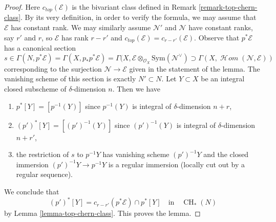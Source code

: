 \documentclass[10pt,a4paper]{amsart}
\theoremstyle{plain}
\theoremstyle{definition}
\theoremstyle{remark}
\numberwithin{equation}{subsection}
\def\SheafHom{\mathop{\mathcal{H}\!\mathit{om}}\nolimits}
\def\CH{\mathop{\mathrm{CH}}\nolimits}
\begin{document}
\begin{proof}
Here $c_{top}(\mathcal{E})$ is the bivariant class defined in
Remark \ref{remark-top-chern-class}. By its very definition, in
order to verify the formula, we may assume that $\mathcal{E}$
has constant rank. We may similarly assume $\mathcal{N}'$ and
$\mathcal{N}$ have constant ranks, say $r'$ and $r$, so
$\mathcal{E}$ has rank $r - r'$ and
$c_{top}(\mathcal{E}) = c_{r - r'}(\mathcal{E})$.
Observe that $p^*\mathcal{E}$ has a canonical section
$$
s \in \Gamma(N, p^*\mathcal{E}) = \Gamma(X, p_*p^*\mathcal{E}) =
\Gamma(X, \mathcal{E} \otimes_{\mathcal{O}_X} \text{Sym}(\mathcal{N}^\vee)
\supset \Gamma(X, \SheafHom(\mathcal{N}, \mathcal{E}))
$$
corresponding to the surjection $\mathcal{N} \to \mathcal{E}$ given
in the statement of the lemma. The vanishing scheme of this section
is exactly $N' \subset N$. Let $Y \subset X$ be an integral closed
subscheme of $\delta$-dimension $n$. Then we have
\begin{enumerate}
\item $p^*[Y] = [p^{-1}(Y)]$ since $p^{-1}(Y)$ is integral of
$\delta$-dimension $n + r$,
\item $(p')^*[Y] = [(p')^{-1}(Y)]$ since $(p')^{-1}(Y)$ is integral of
$\delta$-dimension $n + r'$,
\item the restriction of $s$ to $p^{-1}Y$ has vanishing scheme
$(p')^{-1}Y$ and the closed immersion $(p')^{-1}Y \to p^{-1}Y$
is a regular immersion (locally cut out by a regular sequence).
\end{enumerate}
We conclude that
$$
(p')^*[Y] = c_{r - r'}(p^*\mathcal{E}) \cap p^*[Y]
\quad\text{in}\quad \CH_*(N)
$$
by Lemma \ref{lemma-top-chern-class}. This proves the lemma.
\end{proof}
\end{document}
